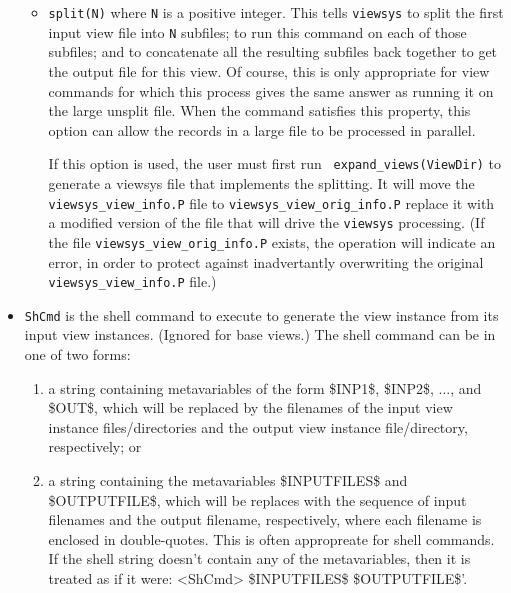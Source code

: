 \begin{itemize}
\begin{itemize}				       

\item {\tt split(N)} where {\tt N} is a positive integer.  This tells
  {\tt viewsys} to split the first input view file into {\tt N}
  subfiles; to run this command on each of those subfiles; and to
  concatenate all the resulting subfiles back together to get the
  output file for this view.  Of course, this is only appropriate for
  view commands for which this process gives the same answer as
  running it on the large unsplit file.  When the command satisfies
  this property, this option can allow the records in a large file to
  be processed in parallel.

  If this option is used, the user must first run {\tt
    expand\_views(ViewDir)} to generate a viewsys file that implements
  the splitting.  It will move the {\tt viewsys\_view\_info.P} file to
  {\tt viewsys\_view\_orig\_info.P} replace it with a modified version
  of the file that will drive the {\tt viewsys} processing.  (If the
  file {\tt viewsys\_view\_orig\_info.P} exists, the operation will
  indicate an error, in order to protect against inadvertantly
  overwriting the original {\tt viewsys\_view\_info.P} file.)

\end{itemize}				       

\item {\tt ShCmd} is the shell command to execute to generate the view
instance from its input view instances. (Ignored for base views.)  The
shell command can be in one of two forms:

\begin{enumerate}

\item a string containing metavariables of the form \$INP1\$, \$INP2\$,
..., and \$OUT\$, which will be replaced by the filenames of the input
view instance files/directories and the output view instance
file/directory, respectively; or

\item a string containing the metavariables \$INPUTFILES\$ and
\$OUTPUTFILE\$, which will be replaces with the sequence of input
filenames and the output filename, respectively, where each filename
is enclosed in double-quotes.  This is often appropreate for shell
commands.  If the shell string doesn't contain any of the
metavariables, then it is treated as if it were: <ShCmd> \$INPUTFILES\$
\$OUTPUTFILE\$'.

\end{enumerate}

\end{itemize}

